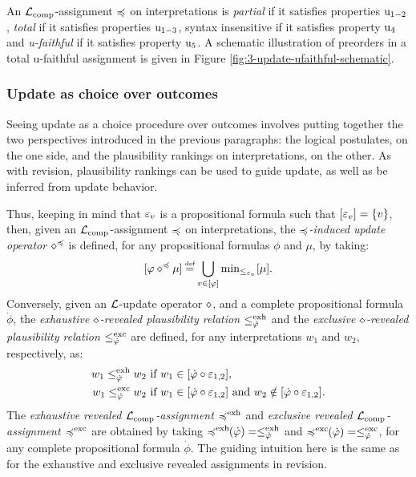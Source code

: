 An $\mathcal{L}_{{\operatorname{comp}}}$-assignment $\preccurlyeq$ on interpretations is 
\emph{partial} if it satisfies properties $\mathrm{u}_{1-2}$,
\emph{total} if it satisfies properties $\mathrm{u}_{1-3}$,
syntax insensitive if it satisfies property $\mathrm{u}_{4}$
and \emph{u-faithful} if it satisfies property $\mathrm{u}_{5}$.
A schematic illustration of preorders in a total u-faithful
assignment is given in Figure \ref{fig:3-update-ufaithful-schematic}.

\subsubsection{Update as choice over outcomes}
Seeing update as a choice procedure over outcomes
involves putting together the two perspectives introduced
in the previous paragraphs: the logical postulates, on the
one side, and the plausibility rankings on interpretations, on the other.
As with revision, plausibility rankings can be used to guide update,
as well as be inferred from update behavior.

Thus, keeping in mind that
$\varepsilon_{v}$ is a propositional formula such that $[\varepsilon_{v}]=\{v\}$,
then, given an $\mathcal{L}_{{\operatorname{comp}}}$-assignment $\preccurlyeq$ on interpretations,
the \emph{$\preccurlyeq$-induced update operator $\diamond^{\preccurlyeq}$}
is defined, for any propositional formulas $\phi$ and $\mu$,
by taking:
$$
[\phi\up^{\as}\mu] \defeq \bigcup_{v\in[\phi]}\min_{\le_{\px_{v}}}[\mu].
$$
Conversely, given an $\mathcal{L}$-update operator $\diamond$,
and a complete propositional formula $\dot{\phi}$,
the \emph{exhaustive $\diamond$-revealed plausibility relation $\le^{\operatorname{exh}}_{\dot{\varphi}}$} 
and the \emph{exclusive $\diamond$-revealed plausibility relation $\le^{\operatorname{exc}}_{\dot{\varphi}}$} 
are defined, for any interpretations $w_1$ and $w_2$, respectively, as:
\begin{align*}
	w_1\le^{\operatorname{exh}}_{\dot{\varphi}} w_2 &~\text{if}~w_1\in[\dot{\varphi}\circ\varepsilon_{1,2}],\\
	w_1\le^{\operatorname{exc}}_{\dot{\varphi}} w_2 &~\text{if}~w_1\in[\dot{\varphi}\circ\varepsilon_{1,2}]~\text{and}~w_2\notin[\dot{\varphi}\circ\varepsilon_{1,2}].
\end{align*}
The \emph{exhaustive revealed $\mathcal{L}_{{\operatorname{comp}}}$-assignment $\preccurlyeq^{\operatorname{exh}}$} 
and \emph{exclusive revealed $\mathcal{L}_{{\operatorname{comp}}}$-assignment $\preccurlyeq^{\operatorname{exc}}$} are obtained
by taking $\preccurlyeq^{\operatorname{exh}}\!\!(\dot{\varphi})=\le^{\operatorname{exh}}_{\dot{\varphi}}$ and $\preccurlyeq^{\operatorname{exc}}\!\!(\dot{\varphi})=\le^{\operatorname{exc}}_{\dot{\varphi}}$, 
for any complete propositional formula $\dot{\phi}$.
The guiding intuition here is the same as for the exhaustive and exclusive revealed
assignments in revision.

